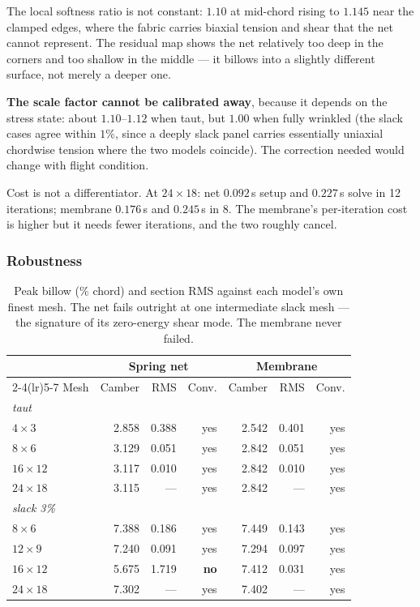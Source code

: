 \documentclass[11pt,a4paper]{article}
\begin{document}
The local softness ratio is not constant: $1.10$ at mid-chord rising to $1.145$
near the clamped edges, where the fabric carries biaxial tension and shear that
the net cannot represent. The residual map shows the net relatively too deep in
the corners and too shallow in the middle --- it billows into a slightly
different surface, not merely a deeper one.

\textbf{The scale factor cannot be calibrated away}, because it depends on the
stress state: about $1.10$--$1.12$ when taut, but $1.00$ when fully wrinkled
(the slack cases agree within $1\%$, since a deeply slack panel carries
essentially uniaxial chordwise tension where the two models coincide). The
correction needed would change with flight condition.

Cost is not a differentiator. At $24\times18$: net $0.092$\,s setup and
$0.227$\,s solve in 12 iterations; membrane $0.176$\,s and $0.245$\,s in 8. The
membrane's per-iteration cost is higher but it needs fewer iterations, and the
two roughly cancel.

\subsubsection{Robustness}

\begin{table}[H]
\centering
\small
\caption{Peak billow (\% chord) and section RMS against each model's own finest
mesh. The net fails outright at one intermediate slack mesh --- the signature of
its zero-energy shear mode. The membrane never failed.}
\begin{tabular}{lrrrrrr}
\toprule
& \multicolumn{3}{c}{Spring net} & \multicolumn{3}{c}{Membrane}\\
\cmidrule(lr){2-4}\cmidrule(lr){5-7}
Mesh & Camber & RMS & Conv. & Camber & RMS & Conv.\\
\midrule
\multicolumn{7}{l}{\emph{taut}}\\
$4\times3$   & 2.858 & 0.388 & yes & 2.542 & 0.401 & yes\\
$8\times6$   & 3.129 & 0.051 & yes & 2.842 & 0.051 & yes\\
$16\times12$ & 3.117 & 0.010 & yes & 2.842 & 0.010 & yes\\
$24\times18$ & 3.115 & ---   & yes & 2.842 & ---   & yes\\
\multicolumn{7}{l}{\emph{slack 3\%}}\\
$8\times6$   & 7.388 & 0.186 & yes & 7.449 & 0.143 & yes\\
$12\times9$  & 7.240 & 0.091 & yes & 7.294 & 0.097 & yes\\
$16\times12$ & 5.675 & 1.719 & \textbf{no} & 7.412 & 0.031 & yes\\
$24\times18$ & 7.302 & ---   & yes & 7.402 & ---   & yes\\
\bottomrule
\end{tabular}
\end{table}
\end{document}
